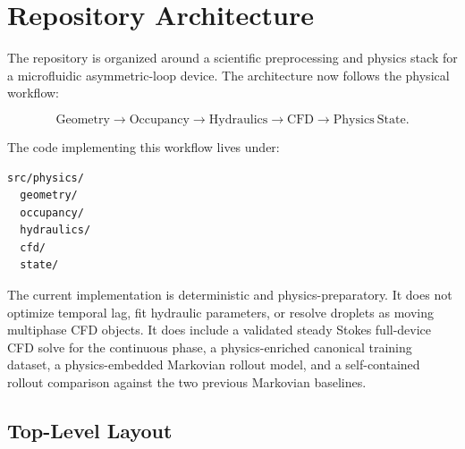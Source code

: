 \section{Repository Architecture}

The repository is organized around a scientific preprocessing and physics stack
for a microfluidic asymmetric-loop device. The architecture now follows the
physical workflow:

\[
\mathrm{Geometry}
\rightarrow
\mathrm{Occupancy}
\rightarrow
\mathrm{Hydraulics}
\rightarrow
\mathrm{CFD}
\rightarrow
\mathrm{Physics~State}.
\]

The code implementing this workflow lives under:

\begin{verbatim}
src/physics/
  geometry/
  occupancy/
  hydraulics/
  cfd/
  state/
\end{verbatim}

The current implementation is deterministic and physics-preparatory. It does
not optimize temporal lag, fit hydraulic parameters, or resolve droplets as
moving multiphase CFD objects. It does include a validated steady Stokes
full-device CFD solve for the continuous phase, a physics-enriched canonical
training dataset, a physics-embedded Markovian rollout model, and a
self-contained rollout comparison against the two previous Markovian baselines.

\subsection{Top-Level Layout}

